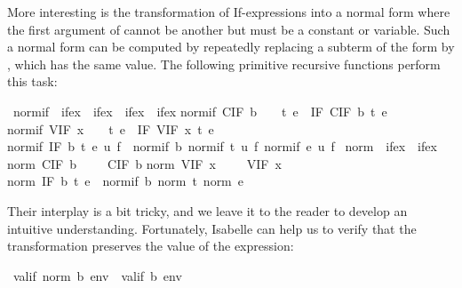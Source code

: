 \begin{isabellebody}
\begin{isamarkuptext}
More interesting is the transformation of If-expressions into a normal form
where the first argument of  cannot be another  but
must be a constant or variable. Such a normal form can be computed by
repeatedly replacing a subterm of the form  by
, which has the same value. The following
primitive recursive functions perform this task:%
\end{isamarkuptext}%
\ normif\ {\isacharcolon}{\isacharcolon}\ {\isachardoublequote}ifex\ {\isasymRightarrow}\ ifex\ {\isasymRightarrow}\ ifex\ {\isasymRightarrow}\ ifex{\isachardoublequote}\isanewline
{}\isanewline
{\isachardoublequote}normif\ {\isacharparenleft}CIF\ b{\isacharparenright}\ \ \ \ t\ e\ {\isacharequal}\ IF\ {\isacharparenleft}CIF\ b{\isacharparenright}\ t\ e{\isachardoublequote}\isanewline
{\isachardoublequote}normif\ {\isacharparenleft}VIF\ x{\isacharparenright}\ \ \ \ t\ e\ {\isacharequal}\ IF\ {\isacharparenleft}VIF\ x{\isacharparenright}\ t\ e{\isachardoublequote}\isanewline
{\isachardoublequote}normif\ {\isacharparenleft}IF\ b\ t\ e{\isacharparenright}\ u\ f\ {\isacharequal}\ normif\ b\ {\isacharparenleft}normif\ t\ u\ f{\isacharparenright}\ {\isacharparenleft}normif\ e\ u\ f{\isacharparenright}{\isachardoublequote}\isanewline
\isanewline
{}\ norm\ {\isacharcolon}{\isacharcolon}\ {\isachardoublequote}ifex\ {\isasymRightarrow}\ ifex{\isachardoublequote}\isanewline
{}\isanewline
{\isachardoublequote}norm\ {\isacharparenleft}CIF\ b{\isacharparenright}\ \ \ \ {\isacharequal}\ CIF\ b{\isachardoublequote}\isanewline
{\isachardoublequote}norm\ {\isacharparenleft}VIF\ x{\isacharparenright}\ \ \ \ {\isacharequal}\ VIF\ x{\isachardoublequote}\isanewline
{\isachardoublequote}norm\ {\isacharparenleft}IF\ b\ t\ e{\isacharparenright}\ {\isacharequal}\ normif\ b\ {\isacharparenleft}norm\ t{\isacharparenright}\ {\isacharparenleft}norm\ e{\isacharparenright}{\isachardoublequote}%
\begin{isamarkuptext}%
\noindent
Their interplay is a bit tricky, and we leave it to the reader to develop an
intuitive understanding. Fortunately, Isabelle can help us to verify that the
transformation preserves the value of the expression:%
\end{isamarkuptext}%
\ {\isachardoublequote}valif\ {\isacharparenleft}norm\ b{\isacharparenright}\ env\ {\isacharequal}\ valif\ b\ env{\isachardoublequote}%

\end{isabellebody}
